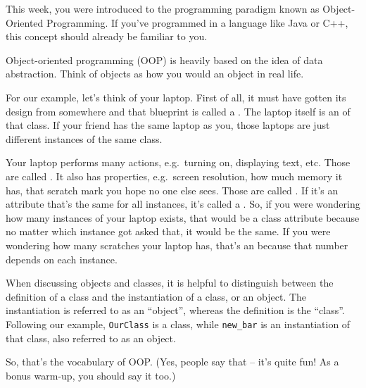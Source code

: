 This week, you were introduced to the programming paradigm known as
Object-Oriented Programming. If you've programmed in a language like Java or
C++, this concept should already be familiar to you.

Object-oriented programming (OOP) is heavily based on the idea of data
abstraction. Think of objects as how you would an object in real life.

For our example, let's think of your laptop. First of all, it must have gotten
its design from somewhere and that blueprint is called a . The
laptop itself is an  of that class. If your friend has the same
laptop as you, those laptops are just different instances of the same class.

Your laptop performs many actions, e.g.\ turning on, displaying text, etc\@.
Those are called . It also has properties, e.g.\ screen
resolution, how much memory it has, that scratch mark you hope no one else
sees. Those are called . If it's an attribute that's the same
for all instances, it's called a . So, if you were
wondering how many instances of your laptop exists, that would be a class
attribute because no matter which instance got asked that, it would be the same.
If you were wondering how many scratches your laptop has, that's an
 because that number depends on each instance.

When discussing objects and classes, it is helpful to distinguish between the
definition of a class and the instantiation of a class, or an object. The
instantiation is referred to as an ``object'', whereas the definition is the
``class''. Following our example, \texttt{OurClass} is a class, while
\texttt{new\_bar} is an instantiation of that class, also referred to as an
object.

So, that's the vocabulary of OOP. (Yes, people say that -- it's quite fun! As
a bonus warm-up, you should say it too.)


